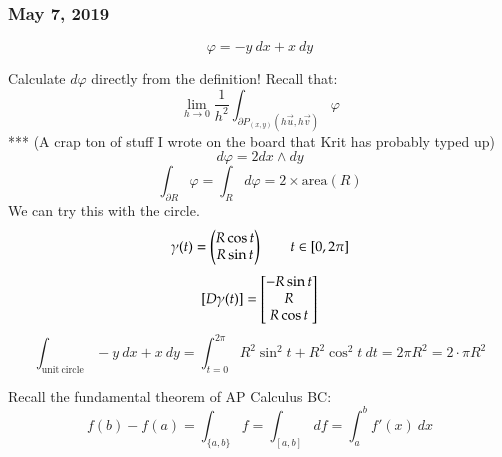 \subsubsection*{May 7, 2019}

\[\varphi = -y\ dx + x\ dy \]

Calculate $d\varphi$ directly from the definition! Recall that: 
\[\lim_{h\to 0} \frac{1}{h^2}\int_{\partial P_{(x, y)}(h\vec{u},h\vec{v})}\varphi\]
*** (A crap ton of stuff I wrote on the board that Krit has probably typed up)
\[d\varphi = 2dx\wedge dy\]
\[\boxed{\int_{\partial R}\varphi = \int_R d\varphi} = 2\times \mathrm{area}(R)\]
We can try this with the circle. 
\[\gamma(t)=\begin{pmatrix} R\cos t \\ R \sin t \end{pmatrix}\qquad t\in [0,2\pi]\]
\[[D\gamma(t)]=\begin{bmatrix} -R\sin t \\ R \\ R \cos t \end{bmatrix}\]
\[\int_{\mathrm{unit\ circle}}-y\ dx + x\ dy = \int_{t=0}^{2\pi} R^2\sin^2 t + R^2 \cos^2 t\ dt = 2\pi R^2 = 2\cdot \pi R^2\]

Recall the fundamental theorem of AP Calculus BC: 
\[f(b)-f(a)=\int_{\{a, b\}} f = \int_{[a, b]}df = \int_a^b f'(x)\ dx\]
